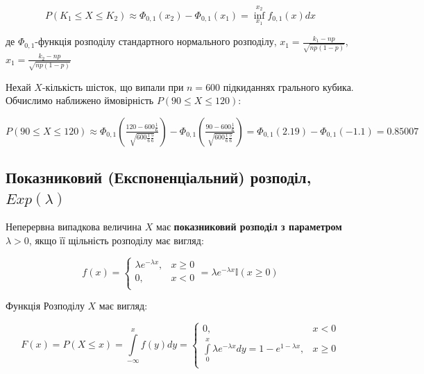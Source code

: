 \begin{equation}
    P(K_1 \leqslant X \leqslant K_2)
    \approx \Phi_{0,1}(x_2) - \Phi_{0,1}(x_1)
    = \inf\limits_{x_1}^{x_2} f_{0,1}(x)dx
\end{equation}

де $\Phi_{0,1}$-функція розподілу стандартного нормального розподілу,
$x_1 = \frac{k_1 - np}{\sqrt{np(1-p)}}$, $x_1 = \frac{k_2 - np}{\sqrt{np(1-p)}}$

\begin{example}
    Нехай $X$-кількість шісток, що випали при $n = 600$ підкиданнях грального кубика.
    Обчислимо наближено ймовірність $P(90 \leqslant X \leqslant 120)$:

    $P(90 \leqslant X \leqslant 120)
    \approx \Phi_{0,1}(\frac{120 - 600 \frac{1}{6}}{\sqrt{600 \frac{1}{6} \frac{5}{6}}})
        - \Phi_{0,1}(\frac{90 - 600 \frac{1}{6}}{\sqrt{600 \frac{1}{6} \frac{5}{6}}})
    = \Phi_{0,1}(2.19) - \Phi_{0,1}(-1.1)
    =0.85007$
\end{example}

\subsection[Показниковий (Експоненціальний) розподіл]{Показниковий (Експоненціальний) розподіл, $Exp(\lambda)$}

Неперервна випадкова величина $X$ має \textbf{показниковий розподіл з параметром $\lambda > 0$},
якщо її щільність розподілу має вигляд:

\begin{equation}
    f(x) = \left\{\begin{array}{ll}
        \lambda e^{-\lambda x}, & x \geqslant 0 \\
        0, & x < 0 \\
    \end{array}\right.
    = \lambda e^{-\lambda x} \mathbb{I}(x \geqslant 0)
\end{equation}

Функція Розподілу $X$ має вигляд:

\begin{equation}
    F(x) = P(X \leqslant x)
    = \int\limits_{-\infty}^{x} f(y) dy
    = \left\{\begin{array}{ll}
        0, & x < 0 \\
        \int\limits_{0}^{x}\lambda e^{-\lambda x} dy = 1 - e^{1-\lambda x}, & x \geqslant 0 \\
    \end{array}\right.
\end{equation}

